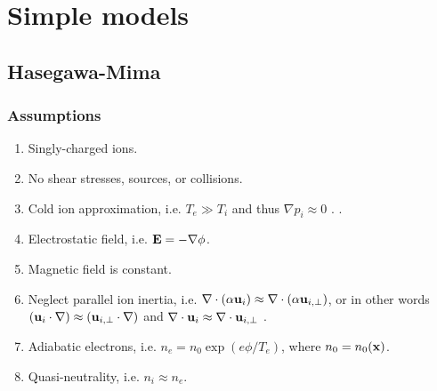 \documentclass[oneside,a4paper,11pt]{report}
\begin{document}
\chapter{Simple models}
\section{Hasegawa-Mima}
\subsection{Assumptions}
\begin{enumerate}
    \item Singly-charged ions. \label{it:single_charge_ions}
    \item No shear stresses, sources, or collisions. \label{it:no_shear_source_coll}
    \item Cold ion approximation, i.e. $T_e \gg T_i$ and thus $\nabla p_i \approx 0$ \cite{hasegawa1977}. \label{it:cold}.
    \item Electrostatic field, i.e. $\mathbf{E} = - \nabla \phi$. \label{it:electrostatic}
    \item Magnetic field is constant.
    \item Neglect parallel ion inertia, i.e. $\nabla \cdot (\alpha \mathbf{u}_i) \approx \nabla \cdot (\alpha \mathbf{u}_{i,\perp})$, or in other words $(\mathbf{u}_i \cdot \nabla) \approx (\mathbf{u}_{i,\perp} \cdot \nabla)$ and $\nabla \cdot \mathbf{u}_i \approx \nabla \cdot \mathbf{u}_{i,\perp}$ \cite{hasegawa1977}. \label{it:par_ion}
    \item Adiabatic electrons, i.e. $n_e = n_0 \exp (e\phi/T_e)$, where $n_0 = n_0(\mathbf{x})$. \label{it:adiabatic}
    \item Quasi-neutrality, i.e. $n_i \approx n_e$. \label{it:quasineutrality}
\end{enumerate}

\end{document}
